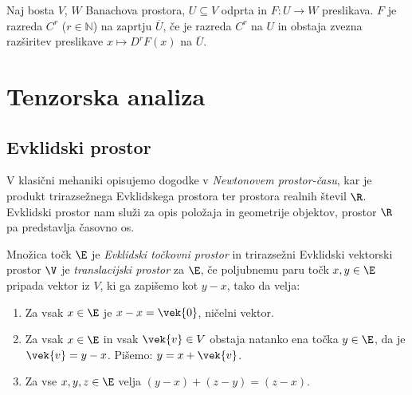 \begin{definicija}
	Naj bosta $V$, $W$ Banachova prostora, $U\subseteq V$ odprta in $F\colon U\to W$ preslikava. 
	$F$ je razreda $C^r$ ($r\in\mathbb{N}$) na zaprtju $\overline{U}$, če je razreda $C^r$ na $U$ in
	obstaja zvezna razširitev preslikave $x\mapsto D^rF(x)$ na $\overline{U}$.
\end{definicija}

\begin{comment}
Naj bosta $(V_1,\|\cdot\|_1)$, $(V_2,\|\cdot\|_2)$ Banachova prostora. $V=V_1\times V_2$
je vektorski prostor, z ustrezno definirano normo $\|\cdot\|_V$, porojeno iz norm $\|\cdot\|_1$ in $\|\cdot\|_2$,
pa postane Banachov prostor. Naj bo $F\colon U\to W$, kjer je $U\subseteq V$ odprta množica, in naj bosta
\[ U_1=\{x\in V_1\;;\ (x,y_0)\in U\}\quad\textrm{ter}\quad U_2=\{y\in V_2\;;\ (x_0,y)\in U\}. \]
Če v točki $(x_0,y_0)\in U$ obstajata
\begin{itemize}
\item odvod preslikave $F(\cdot,y_0)\colon U_1\to W$, ki ga označimo z $\partial_1 F(x_0,y_0)$ in
\item odvod preslikave $F(x_0,\cdot)\colon U_2\to W$, ki ga označimo z $\partial_2 F(x_0,y_0)$
\end{itemize}
in sta oba zvezna, potem je $F$ odvedljiva v $(x_0,y_0)$ in velja
\[ DF(x_0,y_0)(u,v)=\partial_1 F(x_0,y_0)(u)+\partial_2 F(x_0,y_0)(v). \]
\end{comment}


\section{Tenzorska analiza}


\subsection{Evklidski prostor}


V klasični mehaniki opisujemo dogodke v \emph{Newtonovem prostor-času}, kar je produkt
trirazsežnega Evklidskega prostora ter prostora realnih števil $\R$. Evklidski prostor nam služi
za opis položaja in geometrije objektov, prostor $\R$ pa predstavlja časovno os.

\begin{definicija} \label{d:ep}
	Množica točk $\E$ je \emph{Evklidski točkovni prostor} in trirazsežni Evklidski vektorski prostor $\V$ je
	\emph{translacijski prostor} za $\E$, če poljubnemu paru točk $x,y\in\E$ pripada vektor iz $V$,
	ki ga zapišemo kot $y-x$, tako da velja:
	\begin{enumerate}
		\item Za vsak $x\in\E$ je $x-x=\vek{0}$, ničelni vektor.
		\item Za vsak $x\in\E$ in vsak $\vek{v}\in V$ obstaja natanko ena točka $y\in\E$, da je
		$\vek{v}=y-x$. Pišemo: $y=x+\vek{v}$.
		\item Za vse $x,y,z\in\E$ velja $(y-x)+(z-y)=(z-x)$.
	\end{enumerate}
\end{definicija}

